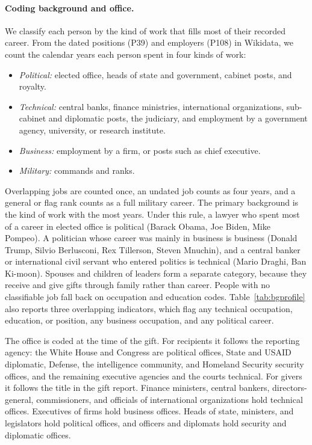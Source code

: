 \documentclass[11pt]{article}
\begin{document}
\paragraph{Coding background and office.} We classify each person by the kind of work that fills most of their recorded career. From the dated positions (P39) and employers (P108) in Wikidata, we count the calendar years each person spent in four kinds of work:
\begin{itemize}
\item \emph{Political:} elected office, heads of state and government, cabinet posts, and royalty.
\item \emph{Technical:} central banks, finance ministries, international organizations, sub-cabinet and diplomatic posts, the judiciary, and employment by a government agency, university, or research institute.
\item \emph{Business:} employment by a firm, or posts such as chief executive.
\item \emph{Military:} commands and ranks.
\end{itemize}
Overlapping jobs are counted once, an undated job counts as four years, and a general or flag rank counts as a full military career. The primary background is the kind of work with the most years. Under this rule, a lawyer who spent most of a career in elected office is political (Barack Obama, Joe Biden, Mike Pompeo). A politician whose career was mainly in business is business (Donald Trump, Silvio Berlusconi, Rex Tillerson, Steven Mnuchin), and a central banker or international civil servant who entered politics is technical (Mario Draghi, Ban Ki-moon). Spouses and children of leaders form a separate category, because they receive and give gifts through family rather than career. People with no classifiable job fall back on occupation and education codes. Table~\ref{tab:bgprofile} also reports three overlapping indicators, which flag any technical occupation, education, or position, any business occupation, and any political career.

The office is coded at the time of the gift. For recipients it follows the reporting agency: the White House and Congress are political offices, State and USAID diplomatic, Defense, the intelligence community, and Homeland Security security offices, and the remaining executive agencies and the courts technical. For givers it follows the title in the gift report. Finance ministers, central bankers, directors-general, commissioners, and officials of international organizations hold technical offices. Executives of firms hold business offices. Heads of state, ministers, and legislators hold political offices, and officers and diplomats hold security and diplomatic offices.
\end{document}
